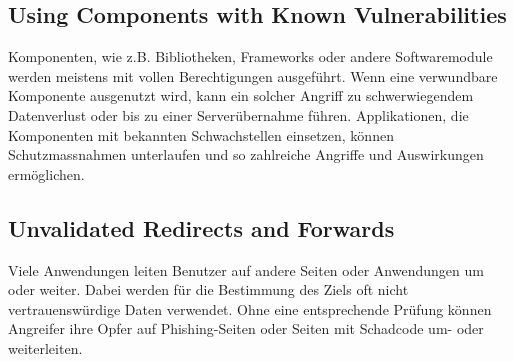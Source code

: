 \subsection{Using Components with Known Vulnerabilities}
Komponenten, wie z.B. Bibliotheken, Frameworks oder andere Softwaremodule werden meistens mit vollen Berechtigungen ausgeführt. Wenn eine verwundbare Komponente ausgenutzt wird, kann ein solcher Angriff zu schwerwiegendem Datenverlust oder bis zu einer Serverübernahme führen. Applikationen, die Komponenten mit bekannten Schwachstellen einsetzen, können Schutzmassnahmen unterlaufen und so zahlreiche Angriffe und Auswirkungen ermöglichen.

\subsection{Unvalidated Redirects and Forwards}
Viele Anwendungen leiten Benutzer auf andere Seiten oder Anwendungen um oder weiter. Dabei werden für die Bestimmung des Ziels oft nicht vertrauenswürdige Daten verwendet. Ohne eine entsprechende Prüfung können Angreifer ihre Opfer auf Phishing-Seiten oder Seiten mit Schadcode um- oder weiterleiten.